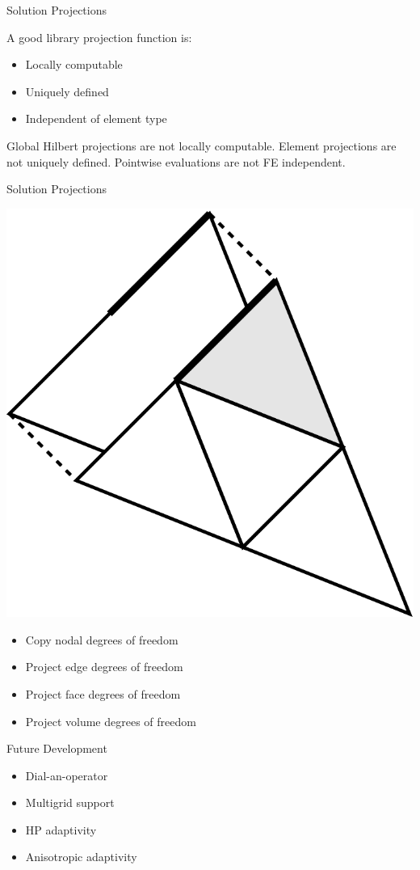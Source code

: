 \begin{foil}{Solution Projections}

A good library projection function is:

\begin{itemize}
	\item Locally computable
	\item Uniquely defined
	\item Independent of element type
\end{itemize}

Global Hilbert projections are not locally computable.
Element projections are not uniquely defined.
Pointwise evaluations are not FE independent.

\end{foil}


\begin{foil}{Solution Projections}

    \begin{center}
      \vspace{-2em}
      \includegraphics[width=.2\textwidth]{figs/adaptive}
    \end{center}

\begin{itemize}
	\item Copy nodal degrees of freedom
	\item Project edge degrees of freedom
	\item Project face degrees of freedom
	\item Project volume degrees of freedom
\end{itemize}

\end{foil}

\begin{foil}{Future Development}

\begin{itemize}
	\item Dial-an-operator
	\item Multigrid support
	\item HP adaptivity
	\item Anisotropic adaptivity
\end{itemize}

\end{foil}

